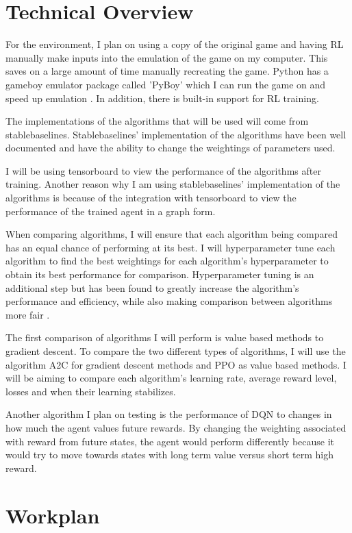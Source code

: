 \documentclass{surrey_disso_style}
\begin{document}
\section{Technical Overview}

For the environment, I plan on using a copy of the original game and having RL manually make inputs into the emulation of the game 
on my computer. This saves on a large amount of time manually recreating the game. Python has a gameboy emulator package called 'PyBoy'
which I can run the game on and speed up emulation \cite{pyboy}. In addition, there is built-in support for RL training.

The implementations of the algorithms that will be used will come from stablebaselines. Stablebaselines' implementation of the algorithms 
have been well documented and have the ability to change the weightings of parameters used. 

I will be using tensorboard to view the performance of the algorithms after training. Another reason why I am using stablebaselines'
implementation of the algorithms is because of the integration with tensorboard to view the performance of the trained agent in a graph
form.

When comparing algorithms, I will ensure that each algorithm being compared has an equal chance of performing at its best. I will 
hyperparameter tune each algorithm to find the best weightings for each algorithm's hyperparameter to obtain its best performance 
for comparison. Hyperparameter tuning is an additional step but has been found to greatly increase the algorithm's performance and 
efficiency, while also making comparison between algorithms more fair \cite{zhang2021importance}.

The first comparison of algorithms I will perform is value based methods to gradient descent. To compare the two different types of 
algorithms, I will use the algorithm A2C for gradient descent methods and PPO as value based methods. I will be aiming to compare each
algorithm's learning rate, average reward level, losses and when their learning stabilizes.

Another algorithm I plan on testing is the performance of DQN to changes in how much the agent values future rewards. By changing the 
weighting associated with reward from future states, the agent would perform differently because it would try to move towards states with 
long term value versus short term high reward.

\section{Workplan}
\end{document}
